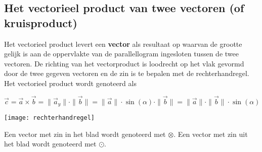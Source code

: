 \documentclass{ximera}
\begin{document}
\subsection*{Het vectorieel product van twee vectoren (of kruisproduct)}

Het vectorieel product levert een \textbf{vector} als resultaat op waarvan de grootte gelijk is aan de oppervlakte van de parallellogram ingesloten tussen de twee vectoren. 
De richting van het vectorproduct is loodrecht op het vlak gevormd door de twee gegeven vectoren en de zin is te bepalen met de rechterhandregel.
Het vectorieel product wordt genoteerd als 

\[
\vec{c} = \vec{a} \times \vec{b} = \| \vec{a}_y \| \cdot \|\vec{b}\| = \|\vec{a}\| \cdot \sin(\alpha) \cdot \|\vec{b}\| = \| \vec{a}\| \cdot \| \vec{b}\| \cdot \sin(\alpha)
\]

\begin{image}[!]

    
\end{image}

\begin{image}[0.2\textwidth]
\texttt{[image: rechterhandregel]}
\end{image}


\begin{remark}
    Een vector met zin in het blad wordt genoteerd met \(\otimes\). Een vector met zin uit het blad wordt genoteerd met \(\odot\).
\end{remark}
\end{document}
